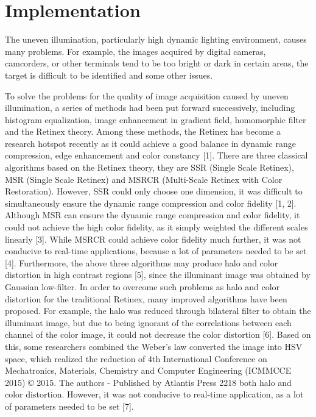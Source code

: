\chapter{Implementation}
The uneven illumination, particularly high dynamic lighting environment, causes many problems.
For example, the images acquired by digital cameras, camcorders, or other terminals tend to be too
bright or dark in certain areas, the target is difficult to be identified and some other issues. 

To solve the problems for the quality of image acquisition caused by uneven illumination, a
series of methods had been put forward successively, including histogram equalization, image
enhancement in gradient field, homomorphic filter and the Retinex theory. Among these methods,
the Retinex has become a research hotspot recently as it could achieve a good balance in dynamic
range compression, edge enhancement and color constancy [1]. There are three classical algorithms
based on the Retinex theory, they are SSR (Single Scale Retinex), MSR (Single Scale Retinex) and
MSRCR (Multi-Scale Retinex with Color Restoration). However, SSR could only choose one
dimension, it was difficult to simultaneously ensure the dynamic range compression and color
fidelity [1, 2]. Although MSR can ensure the dynamic range compression and color fidelity, it could
not achieve the high color fidelity, as it simply weighted the different scales linearly [3]. While
MSRCR could achieve color fidelity much further, it was not conducive to real-time applications,
because a lot of parameters needed to be set [4]. Furthermore, the above three algorithms may
produce halo and color distortion in high contrast regions [5], since the illuminant image was
obtained by Gaussian low-filter. 
In order to overcome such problems as halo and color distortion for the traditional Retinex, many
improved algorithms have been proposed. For example, the halo was reduced through bilateral filter
to obtain the illuminant image, but due to being ignorant of the correlations between each channel
of the color image, it could not decrease the color distortion [6]. Based on this, some researchers
combined the Weber’s law converted the image into HSV space, which realized the reduction of
4th International Conference on Mechatronics, Materials, Chemistry and Computer Engineering (ICMMCCE 2015) © 2015. The authors - Published by Atlantis Press 2218
both halo and color distortion. However, it was not conducive to real-time application, as a lot of
parameters needed to be set [7].

